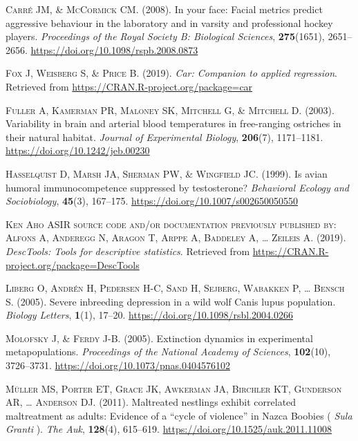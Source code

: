 \documentclass[a4paperpaper,]{article}
\begin{document}
\leavevmode\hypertarget{ref-carre2008}{}%
\textsc{Carré JM, \& McCormick CM}. (2008). In your face: Facial metrics predict aggressive behaviour in the laboratory and in varsity and professional hockey players. \emph{Proceedings of the Royal Society B: Biological Sciences}, \textbf{275}(1651), 2651--2656. \url{https://doi.org/10.1098/rspb.2008.0873}

\leavevmode\hypertarget{ref-R-car}{}%
\textsc{Fox J, Weisberg S, \& Price B}. (2019). \emph{Car: Companion to applied regression}. Retrieved from \url{https://CRAN.R-project.org/package=car}

\leavevmode\hypertarget{ref-Fuller2003}{}%
\textsc{Fuller A, Kamerman PR, Maloney SK, Mitchell G, \& Mitchell D}. (2003). Variability in brain and arterial blood temperatures in free-ranging ostriches in their natural habitat. \emph{Journal of Experimental Biology}, \textbf{206}(7), 1171--1181. \url{https://doi.org/10.1242/jeb.00230}

\leavevmode\hypertarget{ref-Hasselquist1999}{}%
\textsc{Hasselquist D, Marsh JA, Sherman PW, \& Wingfield JC}. (1999). Is avian humoral immunocompetence suppressed by testosterone? \emph{Behavioral Ecology and Sociobiology}, \textbf{45}(3), 167--175. \url{https://doi.org/10.1007/s002650050550}

\leavevmode\hypertarget{ref-R-DescTools}{}%
\textsc{Ken Aho ASIR source code and/or documentation previously published by: Alfons A, Anderegg N, Aragon T, Arppe A, Baddeley A, \ldots{} Zeileis A}. (2019). \emph{DescTools: Tools for descriptive statistics}. Retrieved from \url{https://CRAN.R-project.org/package=DescTools}

\leavevmode\hypertarget{ref-liberg2005}{}%
\textsc{Liberg O, Andrén H, Pedersen H-C, Sand H, Sejberg, Wabakken P, \ldots{} Bensch S}. (2005). Severe inbreeding depression in a wild wolf Canis lupus population. \emph{Biology Letters}, \textbf{1}(1), 17--20. \url{https://doi.org/10.1098/rsbl.2004.0266}

\leavevmode\hypertarget{ref-Molofsky2005}{}%
\textsc{Molofsky J, \& Ferdy J-B}. (2005). Extinction dynamics in experimental metapopulations. \emph{Proceedings of the National Academy of Sciences}, \textbf{102}(10), 3726--3731. \url{https://doi.org/10.1073/pnas.0404576102}

\leavevmode\hypertarget{ref-muller2011}{}%
\textsc{Müller MS, Porter ET, Grace JK, Awkerman JA, Birchler KT, Gunderson AR, \ldots{} Anderson DJ}. (2011). Maltreated nestlings exhibit correlated maltreatment as adults: Evidence of a ``cycle of violence'' in Nazca Boobies ( \emph{Sula} \emph{Granti} ). \emph{The Auk}, \textbf{128}(4), 615--619. \url{https://doi.org/10.1525/auk.2011.11008}
\end{document}

